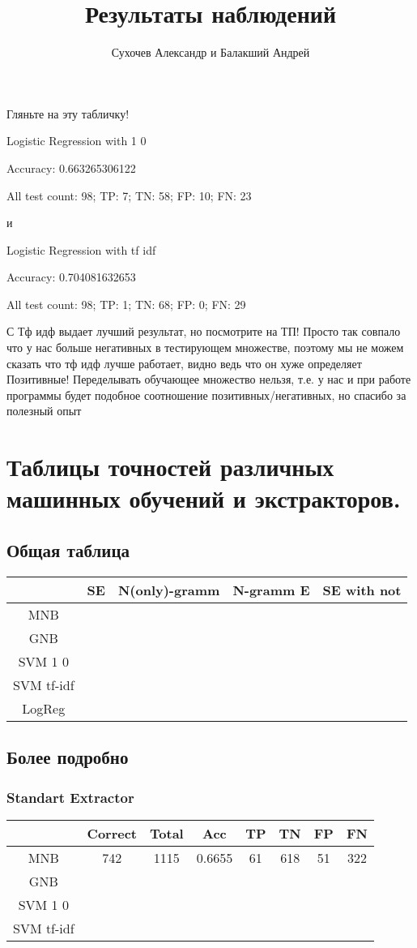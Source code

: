 \documentclass[a4paper, 12pt]{article}
\author{Сухочев Александр и Балакший Андрей}
\title{Результаты наблюдений}
\theoremstyle{plain}
\theoremstyle{definition}
\theoremstyle{remark}
\begin{document}
\maketitle

Гляньте на эту табличку!

Logistic Regression with 1 0

Accuracy: 0.663265306122

All test count: 98; TP: 7; TN: 58; FP: 10; FN: 23

и

Logistic Regression with tf idf

Accuracy: 0.704081632653

All test count: 98; TP: 1; TN: 68; FP: 0; FN: 29

С Тф идф выдает лучший результат, но посмотрите на ТП! Просто так совпало что у нас больше негативных в тестирующем множестве, поэтому мы не можем сказать что тф идф лучше работает, видно ведь что он хуже определяет Позитивные! Переделывать обучающее множество нельзя, т.е. у нас и при работе программы будет подобное соотношение позитивных/негативных, но спасибо за полезный опыт

\section{Таблицы точностей различных машинных обучений и экстракторов.}

\subsection{Общая таблица}
\begin{tabular} {|c|c|c|c|c|}
\hline
   ~~~~ & SE & N(only)-gramm & N-gramm E & SE with not \\
   \hline
  MNB & & & & \\
   \hline
  GNB & & & & \\
   \hline
  SVM 1 0 & & & & \\
   \hline
  SVM tf-idf & & & & \\
   \hline
  LogReg & & & & \\
\hline
\end{tabular}

\subsection{Более подробно}
\subsubsection{Standart Extractor}
\begin{tabular}{|c|c|c|c|c|c|c|c|}
\hline
  ~~~~ & Correct & Total & Acc & TP & TN & FP & FN \\
  \hline
  MNB & 742 & 1115 & 0.6655 & 61 & 618 & 51 & 322  \\
  \hline
  GNB & & & & & & & \\
  \hline
  SVM 1 0 & & & & & & & \\
  \hline
  SVM tf-idf & & & & & & & \\
\hline
\end{tabular}
\end{document}
